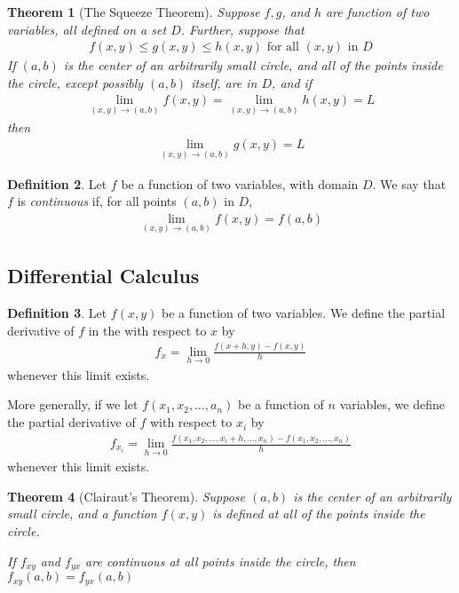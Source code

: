 \documentclass{article}[11pt]
\newtheorem{theorem}{Theorem}[section]
\theoremstyle{definition}
\newtheorem{definition}[theorem]{Definition}
\numberwithin{equation}{section}
\begin{document}
\noindent
\begin{minipage}{\textwidth}
	\begin{theorem}[The Squeeze Theorem]
	Suppose \(f, g\), and \(h\) are function of two variables, all defined on a set \(D\). Further, suppose that
	\begin{align*}
	f(x,y) \leq g(x,y) \leq h(x,y)  \text{ for all }(x,y)\text{ in }D
	\end{align*}
	If \((a,b)\) is the center of an arbitrarily small circle,  and all of the points inside the circle, except possibly \((a,b)\) itself, are in \(D\), and if
	\begin{align*}
	\lim_{(x,y)\to (a,b)} f(x,y)=\lim_{(x,y)\to (a,b)} h(x,y)=L
	\end{align*}
	then
	\begin{align*}
	\lim_{(x,y)\to (a,b)} g(x,y)=L
	\end{align*}
\end{theorem}

\end{minipage}
\begin{definition}
	Let \(f\) be a function of two variables, with domain \(D\). We say that \(f\) is \emph{continuous} if, for all points \((a,b)\) in \(D\),
	\begin{align*}
	\lim_{(x,y)\to (a,b)} f(x,y)=f(a,b)
	\end{align*}
\end{definition}
\subsection{Differential Calculus}

\begin{definition}
	Let \(f(x,y)\) be a function of two variables. We define the partial derivative of \(f\) in the with respect to \(x\) by
	\begin{align}
	f_x=\lim_{h \to 0} \frac{f(x+h,y)-f(x,y)}{h}
	\end{align}
	whenever this limit exists.
	
	More generally, if we let \(f(x_1,x_2,\dots,a_n)\) be a function of \(n\) variables, we define the partial derivative of \(f\) with respect to \( x_i \) by
	\begin{align*}
	f_{x_i}=\lim_{h \to 0} \frac{f(x_1,x_2,\dots,x_i+h,\dots,x_n)-f(x_1,x_2,\dots,x_n)}{h}
	\end{align*}
	whenever this limit exists.
\end{definition}

\begin{theorem}[Clairaut's Theorem]
	Suppose \((a,b)\) is the center of an arbitrarily small circle, and a function \(f(x,y)\) is defined at all of the points inside the circle.
	
	If \(f_{xy}\) and \(f_{yx}\) are continuous at all points inside the circle, then \( f_{xy}(a,b)=f_{yx}(a,b) \)
\end{theorem}
\end{document}
